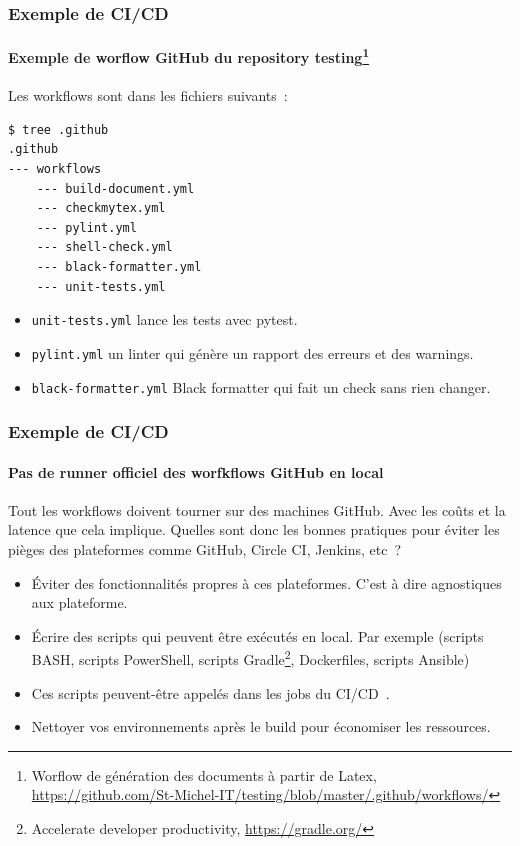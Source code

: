 \documentclass{beamer}
\begin{document}
    \begin{frame}[fragile]
        \frametitle{Exemple de CI/CD}
        \framesubtitle{Exemple de worflow GitHub du repository testing{\footnote{Worflow de génération des documents à partir de Latex, \url{https://github.com/St-Michel-IT/testing/blob/master/.github/workflows/}}}}
        \transdissolve
        Les workflows sont dans les fichiers suivants~:
        \begin{lstlisting}[language=sh]
$ tree .github
.github
--- workflows
    --- build-document.yml
    --- checkmytex.yml
    --- pylint.yml
    --- shell-check.yml
    --- black-formatter.yml
    --- unit-tests.yml
        \end{lstlisting}
        \begin{itemize}
            \item \lstinline{unit-tests.yml} lance les tests avec pytest.
            \item \lstinline{pylint.yml} un linter qui génère un rapport des erreurs et des warnings.
            \item \lstinline{black-formatter.yml} Black formatter qui fait un check sans rien changer.
        \end{itemize}
    \end{frame}

    \begin{frame}
        \frametitle{Exemple de CI/CD}
        \framesubtitle{Pas de runner officiel des worfkflows GitHub en local}
        \transdissolve
        Tout les workflows doivent tourner sur des machines GitHub.
        Avec les coûts et la latence que cela implique.
        \bigbreak
        Quelles sont donc les bonnes pratiques pour éviter les pièges des plateformes comme GitHub, Circle CI, Jenkins, etc~?
        \pause
        \begin{itemize}
            \item Éviter des fonctionnalités propres à ces plateformes.
            C'est à dire agnostiques aux plateforme.
            \item Écrire des scripts qui peuvent être exécutés en local.
            Par exemple (scripts BASH, scripts PowerShell, scripts Gradle\footnote{\label{gradle}Accelerate developer productivity, \url{https://gradle.org/}}, Dockerfiles, scripts Ansible)
            \item Ces scripts peuvent-être appelés dans les jobs du CI/CD~.
            \item Nettoyer vos environnements après le build pour économiser les ressources.
        \end{itemize}
    \end{frame}
\end{document}
